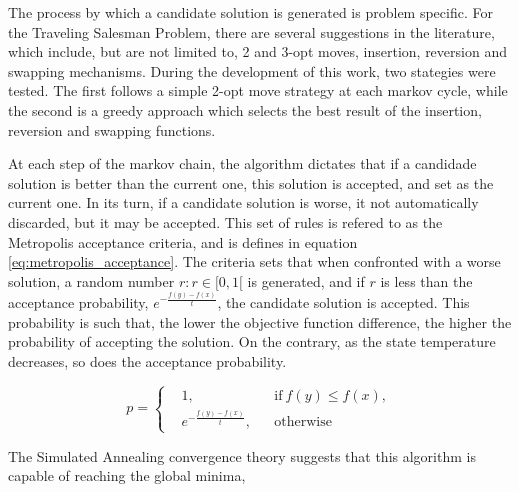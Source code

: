 The process by which a candidate solution is generated is problem specific. For
the Traveling Salesman Problem, there are several suggestions in the literature,
which include, but are not limited to, 2 and 3-opt moves, insertion, reversion
and swapping mechanisms. During the development of this work, two stategies were
tested. The first follows a simple 2-opt move strategy at each markov cycle,
while the second is a greedy approach which selects the best result of the
insertion, reversion and swapping functions.

At each step of the markov chain, the algorithm dictates that if a candidade
solution is better than the current one, this solution is accepted, and set as
the current one. In its turn, if a candidate solution is worse, it not
automatically discarded, but it may be accepted. This set of rules is refered to
as the Metropolis acceptance criteria, and is defines in equation
\ref{eq:metropolis_acceptance}. The criteria sets that when confronted with a
worse solution, a random number $r: r \in [0, 1[$ is generated, and if $r$ is
less than the acceptance probability, $e^{-\frac{f(y)-f(x)}{t}}$, the candidate
solution is accepted. This probability is such that, the lower the objective
function difference, the higher the probability of accepting the solution. On
the contrary, as the state temperature decreases, so does the acceptance
probability.  

\begin{equation}
\label{eq:metropolis_acceptance}
  p =  \left \{
  \begin{aligned}
    & 1, && \text{if}\ f(y) \leq f(x),\\
    & e^{-\frac{f(y)-f(x)}{t}},&& \text{otherwise}
  \end{aligned} \right. 
\end{equation}
  
The Simulated Annealing convergence theory suggests that this algorithm is
capable of reaching the global minima, 
  









